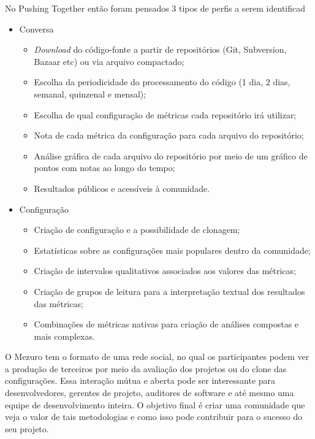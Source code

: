 \documentclass{llncs}
\begin{document}
No Pushing Together então foram pensados 3 tipos de perfis a serem identificad

\begin{itemize}
  \item Conversa
    \begin{itemize}
    \item \textit{Download} do código-fonte a partir de repositórios (Git, Subversion, Bazaar etc) ou via arquivo compactado;
        \item Escolha da periodicidade do processamento do código (1 dia, 2 dias, semanal, quinzenal e mensal);
        \item Escolha de qual configuração de métricas cada repositório irá utilizar;
        \item Nota de cada métrica da configuração para cada arquivo do repositório;
        \item Análise gráfica de cada arquivo do repositório por meio de um gráfico de pontos com notas ao longo do tempo;
        \item Resultados públicos e acessíveis à comunidade.
    \end{itemize}
    \item Configuração
    \begin{itemize}
    \item Criação de configuração e a possibilidade de clonagem;
        \item Estatísticas sobre as configurações mais populares dentro da comunidade;
        \item Criação de intervalos qualitativos associados aos valores das métricas;
        \item Criação de grupos de leitura para a interpretação textual dos resultados das métricas;
        \item Combinações de métricas nativas para criação de análises compostas e mais complexas.
    \end{itemize}
\end{itemize}

O Mezuro tem o formato de uma rede social, no qual os participantes podem ver a
produção de terceiros por meio da avaliação dos projetos ou do clone das
configurações. Essa interação mútua e aberta pode ser interessante para
desenvolvedores, gerentes de projeto, auditores de software e até
mesmo uma equipe de desenvolvimento inteira. O objetivo final é criar uma
comunidade que veja o valor de tais metodologias e como isso pode contribuir
para o sucesso do seu projeto.
\end{document}
